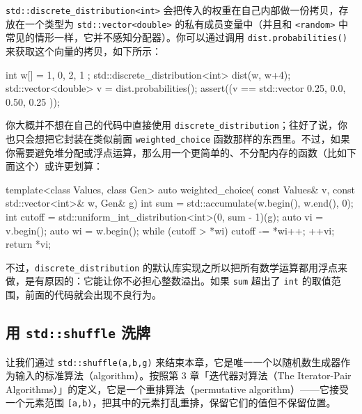 \texttt{std::\allowbreak{}discrete\_\allowbreak{}distribution<\allowbreak{}int>\allowbreak{}} 会把传入的权重在自己内部做一份拷贝，存放在一个类型为 \texttt{std::\allowbreak{}vector<\allowbreak{}double>\allowbreak{}} 的私有成员变量中（并且和 \texttt{<random>\allowbreak{}} 中常见的情形一样，它并不感知分配器）。你可以通过调用 \texttt{dist.\allowbreak{}probabilities(\allowbreak{})\allowbreak{}} 来获取这个向量的拷贝，如下所示：

\begin{codebox}[cpp]
    int w[] = { 1, 0, 2, 1 };
    std::discrete_distribution<int> dist(w, w+4);
    std::vector<double> v = dist.probabilities();
    assert((v == std::vector{ 0.25, 0.0, 0.50, 0.25 }));
\end{codebox}

你大概并不想在自己的代码中直接使用 \texttt{discrete\_\allowbreak{}distribution}；往好了说，你也只会想把它封装在类似前面 \texttt{weighted\_\allowbreak{}choice} 函数那样的东西里。不过，如果你需要避免堆分配或浮点运算，那么用一个更简单的、不分配内存的函数（比如下面这个）或许更划算：

\begin{codebox}[cpp]
    template<class Values, class Gen>
    auto weighted_choice(
      const Values& v, const std::vector<int>& w,
      Gen& g)
    {
      int sum = std::accumulate(w.begin(), w.end(), 0);
      int cutoff = std::uniform_int_distribution<int>(0, sum - 1)(g);
      auto vi = v.begin();
      auto wi = w.begin();
      while (cutoff > *wi) {
        cutoff -= *wi++;
        ++vi;
      }
      return *vi;
    }
\end{codebox}

不过，\texttt{discrete\_\allowbreak{}distribution} 的默认库实现之所以把所有数学运算都用浮点来做，是有原因的：它能让你不必担心整数溢出。如果 \texttt{sum} 超出了 \texttt{int} 的取值范围，前面的代码就会出现不良行为。

\subsection{用 \texttt{std::\allowbreak{}shuffle} 洗牌}

让我们通过 \texttt{std::\allowbreak{}shuffle(\allowbreak{}a,\allowbreak{}b,\allowbreak{}g)\allowbreak{}} 来结束本章，它是唯一一个以随机数生成器作为输入的标准算法（algorithm）。按照第 3 章「迭代器对算法（The Iterator-Pair Algorithms）」的定义，它是一个重排算法（permutative algorithm）——它接受一个元素范围 \texttt{[a,\allowbreak{}b)\allowbreak{}}，把其中的元素打乱重排，保留它们的值但不保留位置。

